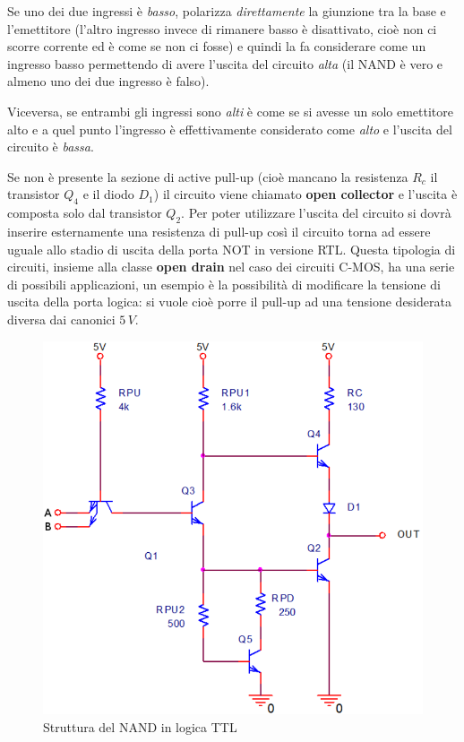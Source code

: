 \documentclass[12pt, a4paper]{report}
\begin{document}
Se uno dei due ingressi è \textit{basso}, polarizza \textit{direttamente} la giunzione tra la base e l'emettitore (l'altro ingresso invece di rimanere basso è disattivato, cioè non ci scorre corrente ed è come se non ci fosse) e quindi la fa considerare come un ingresso basso permettendo di avere l'uscita del circuito \textit{alta} (il NAND è vero e almeno uno dei due ingresso è falso).

Viceversa, se entrambi gli ingressi sono \textit{alti} è come se si avesse un solo emettitore alto e a quel punto l'ingresso è effettivamente considerato come \textit{alto} e l'uscita del circuito è \textit{bassa}.

Se non è presente la sezione di active pull-up (cioè mancano la resistenza $R_c$ il transistor $Q_4$ e il diodo $D_1$) il circuito viene chiamato \textbf{open collector} e l'uscita è composta solo dal transistor $Q_2$. Per poter utilizzare l'uscita del circuito si dovrà inserire esternamente una resistenza di pull-up così il circuito torna ad essere uguale allo stadio di uscita della porta NOT in versione RTL. Questa tipologia di circuiti, insieme alla classe \textbf{open drain} nel caso dei circuiti C-MOS, ha una serie di possibili applicazioni, un esempio è la possibilità di modificare la tensione di uscita della porta logica: si vuole cioè porre il pull-up ad una tensione desiderata diversa dai canonici $5\,V$.
\begin{figure}[ht]
    \centering
    \includegraphics[scale=0.4,angle=0]{ttl_nand.png}
    \caption{Struttura del NAND in logica TTL}
    \label{ttl_nand}
\end{figure}
\end{document}
